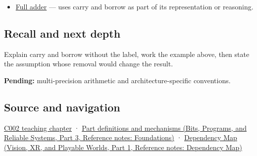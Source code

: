 \hypertarget{appendix-d52d5f78ffd1-used-by}{}

\begin{itemize}
\tightlist
\item
  \hyperref[appendix-d1a5b1e520c2]{Full adder} --- uses carry and borrow as part of its representation or reasoning.
\end{itemize}

\subsection{Recall and next depth}\label{appendix-d52d5f78ffd1-recall-and-next-depth}

\hypertarget{appendix-d52d5f78ffd1-recall-and-next-depth}{}

Explain carry and borrow without the label, work the example above, then state the assumption whose removal would change the result.

\textbf{Pending:} multi-precision arithmetic and architecture-specific conventions.

\subsection{Source and navigation}\label{appendix-d52d5f78ffd1-source-and-navigation}

\hypertarget{appendix-d52d5f78ffd1-source-and-navigation}{}

\hyperref[01-foundations-i-ch001-arithmetic-becomes-a-policy]{C002 teaching chapter} · \href{../01-Bits-Programs-and-Reliable-Systems-P03/main.pdf\#nameddest=appendix-fd090d982a15}{Part definitions and mechanisms (Bits, Programs, and Reliable Systems, Part 3, Reference notes: Foundations)} · \href{../07-Vision-XR-and-Playable-Worlds-P01/main.pdf\#nameddest=appendix-4ad47bdd269a}{Dependency Map (Vision, XR, and Playable Worlds, Part 1, Reference notes: Dependency Map)}
